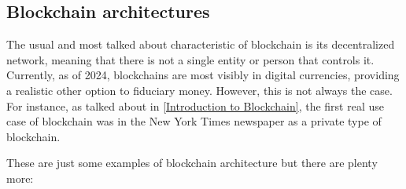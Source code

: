 \subsection{Blockchain architectures}

The usual and most talked about characteristic of blockchain is its decentralized network, meaning that there is not a single entity or person that controls it. Currently, as of 2024, blockchains are most visibly in digital currencies, providing a realistic other option to fiduciary money.  However, this is not always the case. For instance, as talked about in \cref{Introduction to Blockchain}, the first real use case of blockchain was in the New York Times newspaper \cite{firstBlockchain} as a private type of blockchain. 

These are just some examples of blockchain architecture but there are plenty more:


